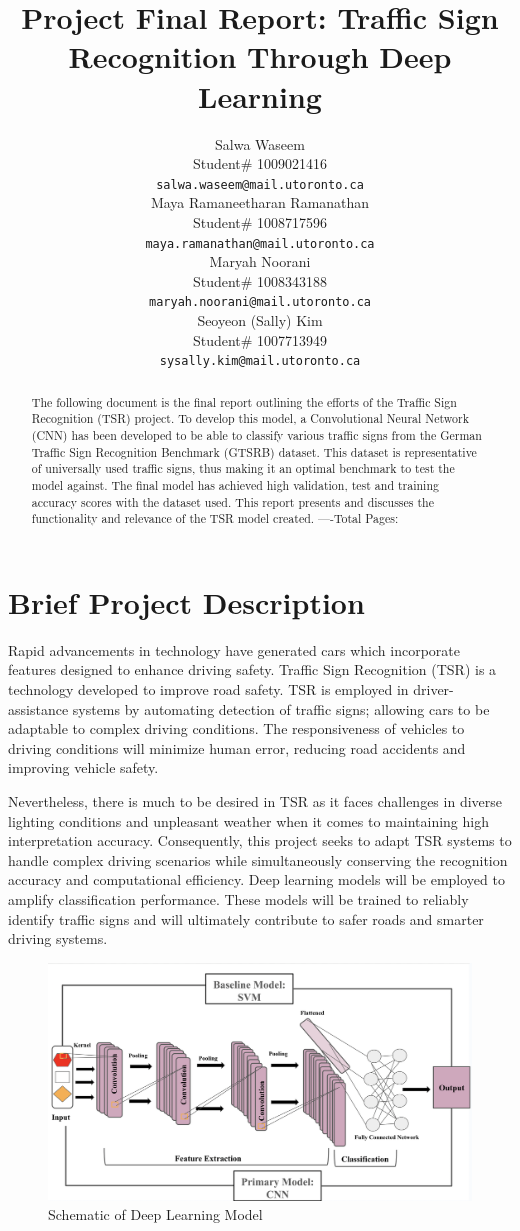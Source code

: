 \documentclass{article} %
\title{Project Final Report: Traffic Sign Recognition Through Deep Learning}
\author{Salwa Waseem  \\
Student\# 1009021416\\
\texttt{salwa.waseem@mail.utoronto.ca} \\
\And
Maya Ramaneetharan Ramanathan  \\
Student\# 1008717596 \\
\texttt{maya.ramanathan@mail.utoronto.ca} \\
\AND
Maryah Noorani  \\
Student\# 1008343188 \\
\texttt{maryah.noorani@mail.utoronto.ca} \\
\And
Seoyeon (Sally) Kim \\
Student\# 1007713949 \\
\texttt{sysally.kim@mail.utoronto.ca} \\
\AND
}
\begin{document}
\maketitle

\begin{abstract}
The following document is the final report outlining the efforts of the Traffic Sign Recognition (TSR) project. To develop this model, a Convolutional Neural Network (CNN) has been developed to be able to classify various traffic signs from the German Traffic Sign Recognition Benchmark (GTSRB) dataset. This dataset is representative of universally used traffic signs, thus making it an optimal benchmark to test the model against. The final model has achieved high validation, test and training accuracy scores with the dataset used. This report presents and discusses the functionality and relevance of the TSR model created. 
----Total Pages: \pageref{last_page}
\end{abstract}



\section{Brief Project Description}
Rapid advancements in technology have generated cars which incorporate features designed to enhance driving safety. Traffic Sign Recognition (TSR) is a technology developed to improve road safety. TSR is employed in driver-assistance systems by automating detection of traffic signs; allowing cars to be adaptable to complex driving conditions. The responsiveness of vehicles to driving conditions will minimize human error, reducing road accidents and improving vehicle safety. 

Nevertheless, there is much to be desired in TSR as it faces challenges in diverse lighting conditions and unpleasant weather when it comes to maintaining high interpretation accuracy. Consequently, this project seeks to adapt TSR systems to handle complex driving scenarios while simultaneously conserving the recognition accuracy and computational efficiency. Deep learning models will be employed to amplify classification performance. These models will be trained to reliably identify traffic signs and will ultimately contribute to safer roads and smarter driving systems. 

\begin{figure}[h]
    \centering
    \includegraphics[width=0.5\linewidth]{project_desc1.png}
    \caption{Schematic of Deep Learning Model}
    \label{fig:enter-label}
\end{figure}
\end{document}
